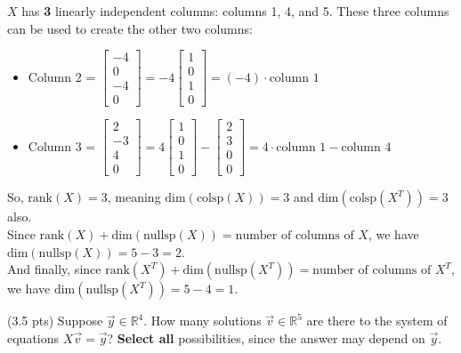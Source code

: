 \documentclass[11pt]{article}
\begin{document}
\begin{prob}
\begin{subprob}
\begin{solution}
$X$ has \textbf{3} linearly independent columns: columns 1, 4, and 5. These three columns can be used to create the other two columns:
\begin{itemize}
    \item Column 2 = $\begin{bmatrix} -4 \\ 0 \\ -4 \\ 0 \end{bmatrix} = -4 \begin{bmatrix} 1 \\ 0 \\ 1 \\ 0 \end{bmatrix} = (-4) \cdot \text{column 1}$
    \item Column 3 = $\begin{bmatrix} 2 \\ -3 \\ 4 \\ 0 \end{bmatrix} = 4 \begin{bmatrix} 1 \\ 0 \\ 1 \\ 0 \end{bmatrix} - \begin{bmatrix} 2 \\ 3\\ 0 \\ 0 \end{bmatrix} = 4 \cdot \text{column 1} - \text{column 4}$
\end{itemize}
So, $\text{rank}(X) = 3$, meaning $\text{dim}(\text{colsp}(X)) = \boxed{3}$ and $\text{dim}(\text{colsp}(X^T)) = \boxed{3}$ also. \\

Since $\text{rank}(X) + \text{dim}(\text{nullsp}(X)) = \text{number of columns of } X$, we have $\text{dim}(\text{nullsp}(X)) = 5 - 3 = \boxed{2}$. \\

And finally, since $\text{rank}(X^T) + \text{dim}(\text{nullsp}(X^T)) = \text{number of columns of } X^T$, we have $\text{dim}(\text{nullsp}(X^T)) = 5 - 4 = \boxed{1}$.

\end{solution}
\end{subprob}

\begin{subprob}(3.5 pts) Suppose $\vec y \in \mathbb{R}^4$. How many solutions $\vec v \in \mathbb{R}^5$ are there to the system of equations $X \vec v = \vec y$? \textbf{Select all} possibilities, since the answer may depend on $\vec y$. \\


\end{subprob}
\end{prob}
\end{document}
